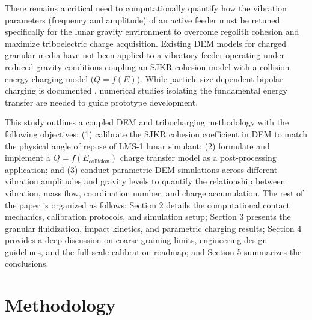 \documentclass[preprint,12pt,authoryear]{elsarticle}
\begin{document}
There remains a critical need to computationally quantify how the vibration parameters (frequency and amplitude) of an active feeder must be retuned specifically for the lunar gravity environment to overcome regolith cohesion and maximize triboelectric charge acquisition. Existing DEM models for charged granular media \citep{Galvin2021, Wu2020} have not been applied to a vibratory feeder operating under reduced gravity conditions coupling an SJKR cohesion model with a collision energy charging model ($Q = f(E)$). While particle-size dependent bipolar charging is documented \citep{Forward2009}, numerical studies isolating the fundamental energy transfer are needed to guide prototype development. 

This study outlines a coupled DEM and tribocharging methodology with the following objectives: (1) calibrate the SJKR cohesion coefficient in DEM to match the physical angle of repose of LMS-1 lunar simulant; (2) formulate and implement a $Q = f(E_{\mathrm{collision}})$ charge transfer model as a post-processing application; and (3) conduct parametric DEM simulations across different vibration amplitudes and gravity levels to quantify the relationship between vibration, mass flow, coordination number, and charge accumulation. The rest of the paper is organized as follows: Section 2 details the computational contact mechanics, calibration protocols, and simulation setup; Section 3 presents the granular fluidization, impact kinetics, and parametric charging results; Section 4 provides a deep discussion on coarse-graining limits, engineering design guidelines, and the full-scale calibration roadmap; and Section 5 summarizes the conclusions.

\section{Methodology}
\label{sec:method}
\end{document}
